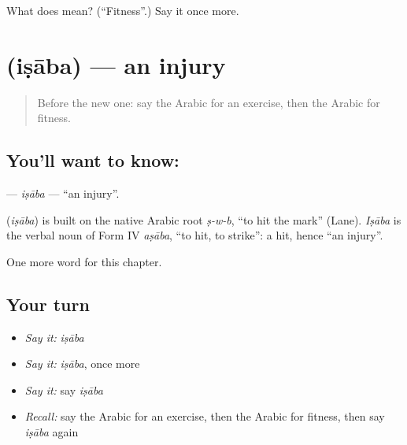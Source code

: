 \begin{tcolorbox}[breakable,colback=teal!4,colframe=teal!35!black,title={Before you move on}]
What does  mean? (\textquotedblleft{}Fitness\textquotedblright{}.) Say it once more.
\end{tcolorbox}
\section[\texorpdfstring{\ar{إصابة} (iṣāba)}{إصابة (iṣāba)}]{ (iṣāba) — an injury}

\label{lesson:AR-C169-isaba}



\begin{quote}
Before the new one: say the Arabic for an exercise, then the Arabic for fitness.
\end{quote}

\subsection*{You'll want to know: }
\textbf{} — \emph{iṣāba} — \textquotedblleft{}an injury\textquotedblright{}.

\begin{cousinweb}
\textbf{} (\emph{iṣāba}) is built on the native Arabic root \emph{ṣ-w-b}, \textquotedblleft{}to hit the mark\textquotedblright{} (Lane). \emph{Iṣāba} is the verbal noun of Form IV \emph{aṣāba}, \textquotedblleft{}to hit, to strike\textquotedblright{}: a hit, hence \textquotedblleft{}an injury\textquotedblright{}.
\end{cousinweb}

\begin{grammarlens}[title={What you've built}]
One more word for this chapter.
\end{grammarlens}

\subsection*{Your turn}
\begin{itemize}
\raggedright
  \item \emph{Say it:} \emph{iṣāba}
  \item \emph{Say it:} \emph{iṣāba}, once more
  \item \emph{Say it:} say \emph{iṣāba}
  \item \emph{Recall:} say the Arabic for an exercise, then the Arabic for fitness, then say \emph{iṣāba} again
\end{itemize}

